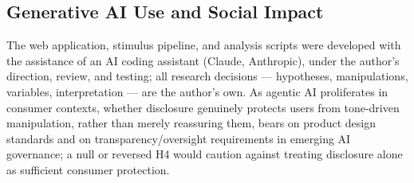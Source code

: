 \documentclass[manuscript]{acmart}
\begin{document}
\subsection{Generative AI Use and Social Impact}
The web application, stimulus pipeline, and analysis scripts were developed with the assistance of an AI coding assistant (Claude, Anthropic), under the author's direction, review, and testing; all research decisions --- hypotheses, manipulations, variables, interpretation --- are the author's own. As agentic AI proliferates in consumer contexts, whether disclosure genuinely protects users from tone-driven manipulation, rather than merely reassuring them, bears on product design standards and on transparency/oversight requirements in emerging AI governance; a null or reversed H4 would caution against treating disclosure alone as sufficient consumer protection.



\end{document}
